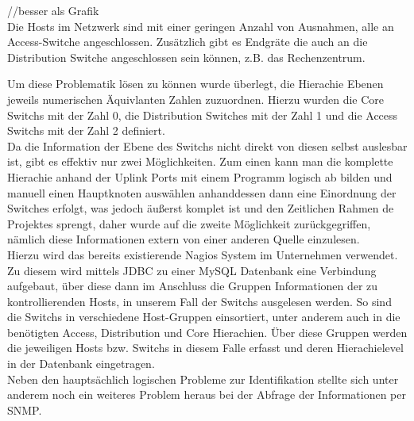 //besser als Grafik\\

Die Hosts im Netzwerk sind mit einer geringen Anzahl von Ausnahmen, alle an Access-Switche angeschlossen. Zusätzlich gibt es Endgräte die auch an die Distribution Switche angeschlossen sein können, z.B. das Rechenzentrum. 

Um diese Problematik lösen zu können wurde überlegt, die Hierachie Ebenen jeweils numerischen Äquivlanten Zahlen zuzuordnen. Hierzu wurden die Core Switchs mit der Zahl 0, die Distribution Switches mit der Zahl 1 und die Access Switchs mit der Zahl 2 definiert.\\
Da die Information der Ebene des Switchs nicht direkt von diesen selbst auslesbar ist, gibt es effektiv nur zwei Möglichkeiten. Zum einen kann man die komplette Hierachie anhand der Uplink Ports mit einem Programm logisch ab bilden und manuell einen Hauptknoten auswählen anhanddessen dann eine Einordnung der Switches erfolgt, was jedoch äußerst komplet ist und den Zeitlichen Rahmen de Projektes sprengt, daher wurde auf die zweite Möglichkeit zurückgegriffen, nämlich diese Informationen extern von einer anderen Quelle einzulesen.\\
Hierzu wird das bereits existierende Nagios System im Unternehmen verwendet. Zu diesem wird mittels JDBC zu einer MySQL Datenbank eine Verbindung aufgebaut, über diese dann im Anschluss die Gruppen Informationen der zu kontrollierenden Hosts, in unserem Fall der Switchs ausgelesen werden. So sind die Switchs in verschiedene Host-Gruppen einsortiert, unter anderem auch in die benötigten Access, Distribution und Core Hierachien. Über diese Gruppen werden die jeweiligen Hosts bzw. Switchs in diesem Falle erfasst und deren Hierachielevel in der Datenbank eingetragen.\\
Neben den hauptsächlich logischen Probleme zur Identifikation stellte sich unter anderem noch ein weiteres Problem heraus bei der Abfrage der Informationen per SNMP.\\
